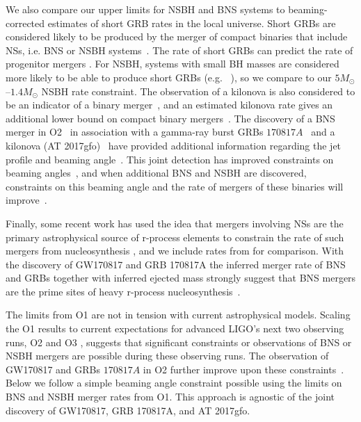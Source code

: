 We also compare our upper limits for \ac{NSBH} and \ac{BNS} systems to beaming-corrected
estimates of short \ac{GRB} rates in the local universe. Short \acp{GRB} are
considered likely to be produced by the merger of compact
binaries that include \acp{NS}, i.e. \ac{BNS} or \ac{NSBH}
systems~\citep{Berger:2013jza}. The rate of short \acp{GRB} can
predict the rate of progenitor mergers %
\citep{Coward:2012gn,Petrillo:2012ij,Siellez:2013hia,Fong:2015oha}.
For \ac{NSBH}, systems with small \ac{BH} masses are considered more likely to be able to
produce short \acp{GRB} (e.g.~ \citep{Duez:2009yz,Giacomazzo:2012zt,Pannarale:2015jia}), so we compare to our
$5 M_{\odot}$--$1.4 M_{\odot}$
\ac{NSBH} rate constraint. The observation of a kilonova is also considered to be an
indicator of a binary merger~\citep{Metzger:2011bv}, and an estimated kilonova rate
gives an additional lower bound on compact binary mergers~\citep{Jin:2015txa}.
The discovery of a BNS merger in \ac{O2}~\cite{TheLIGOScientific:2017qsa} in association
with a gamma-ray burst \acp{GRB} $170817A$~\cite{Abbott_2017_GRB_JOINT} and
a kilonova (AT 2017gfo)~\cite{Abbott_2017_mma,Soares_Santos_2017} have provided
additional information regarding the jet profile and beaming
angle~\cite{Abbott_2017_GRB_JOINT,Williams_2018}.
This joint detection has improved constraints on beaming angles~\cite{Williams_2018}, and when
additional BNS and NSBH are discovered, constraints on this beaming angle
and the rate of mergers of these binaries will improve~\cite{PhysRevX.9.031028}.

Finally, some recent work has used the idea that mergers involving \acp{NS}
are the primary astrophysical source of r-process
elements \citep{1974ApJ...192L.145L,Qian:2007vq} to constrain the rate of such
mergers from nucleosynthesis \citep{Bauswein:2014vfa,Vangioni:2015ofa}, and we
include rates from \citep{Vangioni:2015ofa} for comparison.
With the discovery of GW170817 and GRB 170817A the inferred merger rate of \ac{BNS}
and \acp{GRB} together
with inferred ejected mass strongly suggest that \ac{BNS} mergers are
the prime sites of heavy r-process nucleosynthesis~\cite{Wang_2017, Siegel:2019mlp}.

The limits from \ac{O1} are not in tension with current astrophysical models. Scaling
the \ac{O1} results to current expectations for advanced \ac{LIGO}'s next two observing runs,
O2 and O3 \citep{Aasi:2013wya}, suggests that significant constraints or
observations of \ac{BNS} or \ac{NSBH} mergers are possible during these observing runs.
The observation of GW170817 and \acp{GRB} $170817A$ in O2 further improve upon these
constraints~\cite{Williams_2018}. Below we follow a simple beaming angle constraint possible using the
limits on BNS and NSBH merger rates from \ac{O1}. This approach is agnostic
of the joint discovery of GW170817, GRB 170817A, and AT 2017gfo.

